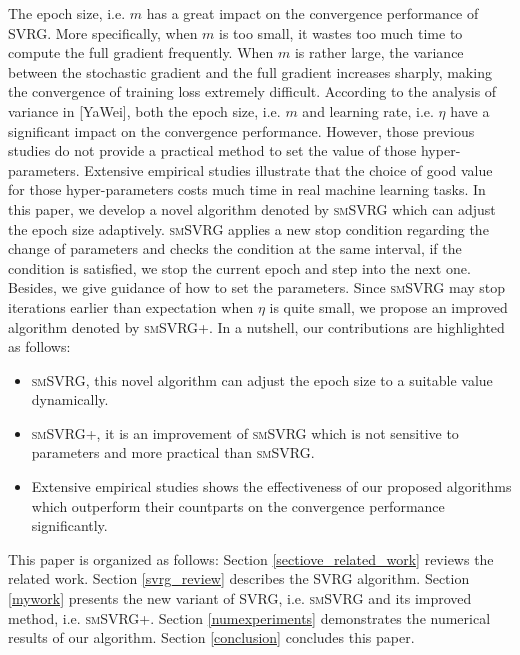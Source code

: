 \documentclass[conference]{IEEEtran}
\begin{document}
The epoch size, i.e. $m$ has a great impact on the convergence performance of SVRG. More specifically, when $m$ is too small, it wastes too much time to compute the full gradient frequently. When $m$ is rather large, the variance between the stochastic gradient and the full gradient increases sharply, making the convergence of training loss extremely difficult. According to the analysis of variance in [YaWei], both the epoch size, i.e. $m$ and learning rate, i.e. $\eta$ have a significant impact on the convergence performance.  However, those previous studies do not provide a practical method to set the value of those hyper-parameters. Extensive empirical studies illustrate that the choice of good value for those hyper-parameters costs much time in real machine learning tasks.  
In this paper, we develop a novel algorithm denoted by \textsc{smSVRG} which can adjust the epoch size adaptively.  
\textsc{smSVRG} applies a new stop condition regarding the change of parameters and checks the condition at the same interval, if the condition is satisfied, we stop the current epoch and step into the next one.
Besides, we give guidance of how to set the parameters. Since \textsc{smSVRG} may stop iterations earlier than expectation when $\eta$ is quite small, we propose an improved algorithm denoted by \textsc{smSVRG+}. In a nutshell, our contributions are highlighted as follows:
\begin {itemize}
\item \textsc{smSVRG}, this novel algorithm can adjust the epoch size to a suitable value dynamically.
\item \textsc{smSVRG+}, it is an improvement of \textsc{smSVRG} which is not sensitive to parameters and more practical than \textsc{smSVRG}.
\item Extensive empirical studies shows the effectiveness of our proposed algorithms which outperform their countparts on the convergence performance significantly.
\end {itemize}
This paper is organized as follows: Section \ref{sectiove_related_work} reviews the related work. Section \ref{svrg_review} describes the SVRG algorithm. Section \ref{mywork} presents the new variant of SVRG, i.e. \textsc{smSVRG} and its improved method, i.e. \textsc{smSVRG+}. Section \ref{numexperiments} demonstrates the numerical results of our algorithm. Section \ref{conclusion} concludes this paper.
\end{document}

